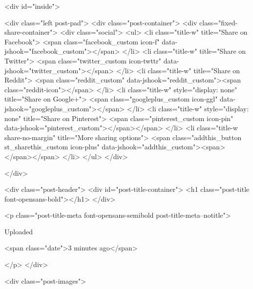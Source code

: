     

        <div id="inside">
        
        <div class="left post-pad">
            <div class="post-container">
                <div class="fixed-share-container">
                    <div class="social">
    <ul>
        <li class="title-w" title="Share on Facebook">
            <span class="facebook_custom icon-f" data-jshook="facebook_custom"></span>
        </li>
        <li class="title-w" title="Share on Twitter">
            <span class="twitter_custom icon-twttr" data-jshook="twitter_custom"></span>
        </li>
        <li class="title-w" title="Share on Reddit">
            <span class="reddit_custom" data-jshook="reddit_custom"><span class="reddit-icon"></span>
        </li>
        <li class="title-w" style="display: none" title="Share on Google+">
            <span class="googleplus_custom icon-ggl" data-jshook="googleplus_custom"></span>
        </li>
        <li class="title-w" style="display: none" title="Share on Pinterest">
            <span class="pinterest_custom icon-pin" data-jshook="pinterest_custom"></span></span>
        </li>
        <li class="title-w share-no-margin" title="More sharing options">
            <span class="addthis_button st_sharethis_custom icon-plus" data-jshook="addthis_custom"><span></span></span>
        </li>
    </ul>
</div>

                </div>

                <div class="post-header">
                    <div id="post-title-container">
                        <h1 class="post-title font-opensans-bold"></h1>
                    </div>

                    <p class="post-title-meta font-opensans-semibold post-title-meta--notitle">
                        

                        
                                                    
                            Uploaded
                        

                                                    <span class="date">3 minutes ago</span>
                        

                        
                        
                    </p>
                </div>

                <div class="post-images">

                                    
                    
